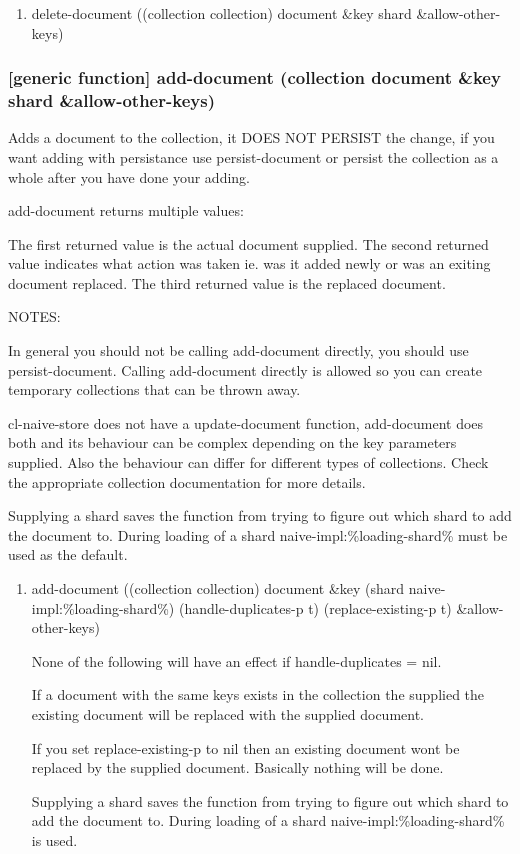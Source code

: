 \documentclass[11pt]{article}
\begin{document}
\begin{enumerate}
\item delete-document ((collection collection) document \&key shard \&allow-other-keys)
\label{sec:orgbb4b7b5}
\end{enumerate}

\subsubsection{[generic function] add-document (collection document \&key shard \&allow-other-keys)}
\label{sec:org16deae6}

Adds a document to the collection, it DOES NOT PERSIST the change, if
you want adding with persistance use persist-document or persist the
collection as a whole after you have done your adding.

add-document returns multiple values:

The first returned value is the actual document supplied.  The second
returned value indicates what action was taken ie. was it added newly
or was an exiting document replaced.  The third returned value is the
replaced document.

NOTES:

In general you should not be calling add-document directly, you should
use persist-document. Calling add-document directly is allowed so you
can create temporary collections that can be thrown away.

cl-naive-store does not have a update-document function, add-document
does both and its behaviour can be complex depending on the key
parameters supplied. Also the behaviour can differ for different types
of collections. Check the appropriate collection documentation for
more details.

Supplying a shard saves the function from trying to figure out which
shard to add the document to. During loading of a shard
naive-impl:\%loading-shard\% must be used as the default.

\begin{enumerate}
\item add-document ((collection collection) document \&key (shard naive-impl:\%loading-shard\%) (handle-duplicates-p t) (replace-existing-p t) \&allow-other-keys)
\label{sec:org9c239f5}

None of the following will have an effect if handle-duplicates = nil.

If a document with the same keys exists in the collection the supplied
the existing document will be replaced with the supplied document.

If you set replace-existing-p to nil then an existing document wont be
replaced by the supplied document. Basically nothing will be done.

Supplying a shard saves the function from trying to figure out which
shard to add the document to. During loading of a shard
naive-impl:\%loading-shard\% is used.
\end{enumerate}
\end{document}
